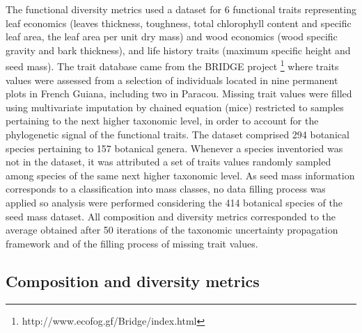 \documentclass[fleqn,10pt]{ArtEcoFoG} %
\theoremstyle{definition}
\theoremstyle{definition}
\theoremstyle{definition}
\theoremstyle{remark}
\begin{document}
The functional diversity metrics used a dataset for 6 functional traits
representing leaf economics (leaves thickness, toughness, total
chlorophyll content and specific leaf area, the leaf area per unit dry
mass) and wood economics (wood specific gravity and bark thickness), and
life history traits (maximum specific height and seed mass). The trait
database came from the BRIDGE project \footnote{http://www.ecofog.gf/Bridge/index.html}
where traits values were assessed from a selection of individuals
located in nine permanent plots in French Guiana, including two in
Paracou. Missing trait values were filled using multivariate imputation
by chained equation (mice) restricted to samples pertaining to the next
higher taxonomic level, in order to account for the phylogenetic signal
of the functional traits. The dataset comprised 294 botanical species
pertaining to 157 botanical genera. Whenever a species inventoried was
not in the dataset, it was attributed a set of traits values randomly
sampled among species of the same next higher taxonomic level. As seed
mass information corresponds to a classification into mass classes, no
data filling process was applied so analysis were performed considering
the 414 botanical species of the seed mass dataset. All composition and
diversity metrics corresponded to the average obtained after 50
iterations of the taxonomic uncertainty propagation framework and of the
filling process of missing trait values.

\subsection{Composition and diversity
metrics}\label{composition-and-diversity-metrics}
\end{document}
